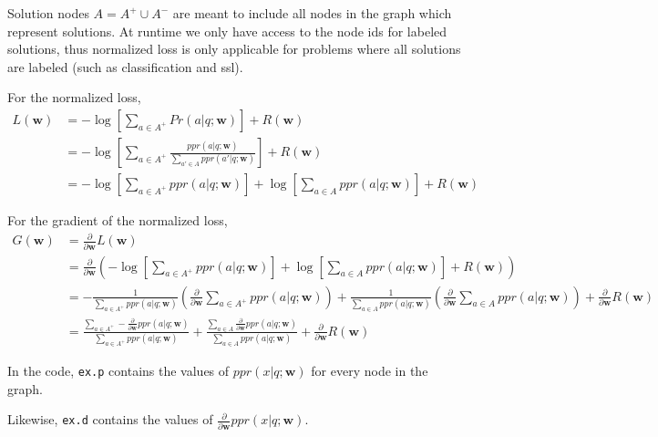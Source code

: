 \documentclass[12pt]{article}
\newcommand{\weightvec}{\textbf{w}}
\newcommand{\vek}[1]{\textbf{#1}}
\newcommand{\ddw}{\frac{\partial}{\partial\vek{w}}}
\begin{document}
Solution nodes $A = A^+ \cup A^-$ are meant to include all nodes in the graph which represent solutions. At runtime we only have access to the node ids for labeled solutions, thus normalized loss is only applicable for problems where all solutions are labeled (such as classification and ssl).

For the normalized loss,
\begin{align}
L(\weightvec) &= -\log\left[ \sum\limits_{a\in A^+} Pr(a | q;\weightvec)\right] + R(\weightvec)\\
&= -\log\left[ \sum\limits_{a\in A^+} \frac{ppr(a|q;\weightvec)}{\sum\limits_{a'\in A} ppr(a' | q;\weightvec)}\right] + R(\weightvec)\\
&= -\log\left[ \sum\limits_{a\in A^+} ppr(a|q;\weightvec)\right] + \log\left[\sum\limits_{a\in A} ppr(a|q;\weightvec)\right] + R(\weightvec)
\end{align}

For the gradient of the normalized loss,
\begin{align}
G(\weightvec) &= \ddw L(\weightvec)\\
&= \ddw \left( -\log\left[ \sum\limits_{a\in A^+} ppr(a|q;\weightvec)\right] + \log\left[\sum\limits_{a\in A} ppr(a|q;\weightvec)\right] + R(\weightvec) \right)\\
&= -\frac{1}{\sum\limits_{a\in A^+} ppr(a|q;\weightvec)}\left(\ddw \sum\limits_{a\in A^+} ppr(a|q;\weightvec)\right) + \frac{1}{\sum\limits_{a\in A} ppr(a|q;\weightvec)}\left(\ddw \sum\limits_{a\in A} ppr(a|q;\weightvec)\right) + \ddw R(\weightvec)\\
&=\frac{\sum\limits_{a\in A^+} - \ddw ppr(a|q;\weightvec)}{\sum\limits_{a\in A^+} ppr(a|q;\weightvec)} + \frac{\sum\limits_{a\in A} \ddw ppr(a|q;\weightvec)}{\sum\limits_{a\in A} ppr(a|q;\weightvec)} + \ddw R(\weightvec)
\end{align}

In the code, {\tt ex.p} contains the values of $ppr(x|q;\weightvec)$ for every node in the graph.

Likewise, {\tt ex.d} contains the values of $\ddw ppr(x|q;\weightvec)$.
\end{document}
